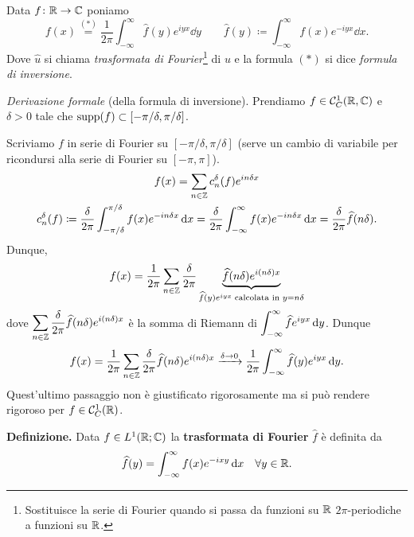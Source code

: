 Data $f \colon \mathbb R \to \mathbb C$ poniamo
%
$$
	f(x) \overset{(\ast)}{=} \frac{1}{2\pi} \int_{-\infty}^\infty \hat{f}(y) e^{iyx} \dd y 
	\qquad \hat{f}(y) \coloneqq \int_{-\infty}^\infty f(x) e^{-iyx} \dd x.
$$
%
Dove $\hat{u}$ si chiama \textit{trasformata di Fourier}\footnote{Sostituisce la serie di Fourier quando si passa da funzioni su $\mathbb R$ $2\pi$-periodiche a funzioni su $\mathbb R$.} di $u$ e la formula $(\ast)$ si dice \textit{formula di inversione}.

\textit{Derivazione formale} (della formula di inversione).
Prendiamo $f \in \mathcal{C}_C^1(\mathbb R,\mathbb C)$ e $\delta > 0$ tale che $\operatorname{supp}(f) \subset [-\pi / \delta, \pi / \delta]$. 

Scriviamo $f$ in serie di Fourier su $[-\pi / \delta, \pi / \delta]$ (serve un cambio di variabile per ricondursi alla serie di Fourier su $[-\pi,\pi]$).
%
\begin{gather*}
	f(x) = \sum_{n \in \mathbb Z} c_n^\delta (f) e^{in \delta x} \\
	c_n^\delta (f) \coloneqq \frac{\delta}{2\pi} \int_{-\pi / \delta}^{\pi / \delta} f(x) e^{-in \delta x} \,\mathrm{d} x
	= \frac{\delta}{2\pi} \int_{-\infty}^\infty f(x) e^{-in \delta x} \,\mathrm{d} x
	= \frac{\delta}{2\pi} \widehat{f}(n\delta).
\end{gather*}
Dunque,
%
$$
	f(x) = \frac{1}{2\pi} \sum_{n \in \mathbb Z} \frac{\delta}{2\pi} \underbrace{\widehat{f}(n\delta) e^{i(n\delta)x}}_{\widehat{f}(y) e^{iyx} \; \text{calcolata in } y = n\delta}
$$
%
dove $\displaystyle \sum_{n \in \mathbb Z} \frac{\delta}{2\pi}\widehat{f}(n\delta) e^{i(n\delta)x} $ è la somma di Riemann di $\displaystyle \int_{-\infty}^{\infty} \widehat{f} e^{iyx} \,\mathrm{d} y$.
Dunque
%
$$
	f(x) = \frac{1}{2\pi} \sum_{n \in \mathbb Z} \frac{\delta}{2\pi} \widehat{f}(n\delta) e^{i(n\delta)x}
	\xrightarrow{\delta \to 0}
	\frac{1}{2\pi} \int_{-\infty}^{\infty} \widehat{f}(y) e^{iyx} \,\mathrm{d} y.
$$
%
Quest'ultimo passaggio non è giustificato rigorosamente ma si può rendere rigoroso per $f \in \mathcal{C}_C^1(\mathbb R)$.

\vss

\textbf{Definizione.} Data $f \in L^1(\mathbb R; \mathbb C)$ la \textbf{trasformata di Fourier} $\hat{f}$ è definita da
%
$$
	\widehat{f}(y) = \int_{-\infty}^\infty f(x) e^{-ixy} \,\mathrm{d} x \quad \forall y \in \mathbb R.
$$
%

\newpage


